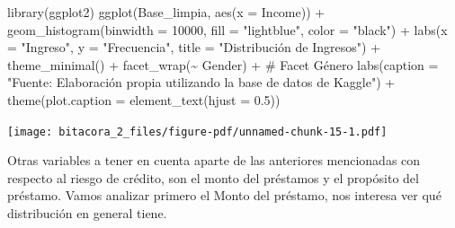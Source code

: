 \documentclass[
  letterpaper,
  DIV=11,
  numbers=noendperiod]{scrreprt}
\newenvironment{Shaded}{\begin{snugshade}}{\end{snugshade}}
\newcommand{\AttributeTok}[1]{\textcolor[rgb]{0.40,0.45,0.13}{#1}}
\newcommand{\CommentTok}[1]{\textcolor[rgb]{0.37,0.37,0.37}{#1}}
\newcommand{\DecValTok}[1]{\textcolor[rgb]{0.68,0.00,0.00}{#1}}
\newcommand{\FloatTok}[1]{\textcolor[rgb]{0.68,0.00,0.00}{#1}}
\newcommand{\FunctionTok}[1]{\textcolor[rgb]{0.28,0.35,0.67}{#1}}
\newcommand{\NormalTok}[1]{\textcolor[rgb]{0.00,0.23,0.31}{#1}}
\newcommand{\SpecialCharTok}[1]{\textcolor[rgb]{0.37,0.37,0.37}{#1}}
\newcommand{\StringTok}[1]{\textcolor[rgb]{0.13,0.47,0.30}{#1}}
\begin{document}
\begin{Shaded}
\begin{Highlighting}[]
\FunctionTok{library}\NormalTok{(ggplot2)}
\FunctionTok{ggplot}\NormalTok{(Base\_limpia, }\FunctionTok{aes}\NormalTok{(}\AttributeTok{x =}\NormalTok{ Income)) }\SpecialCharTok{+} 
  \FunctionTok{geom\_histogram}\NormalTok{(}\AttributeTok{binwidth =} \DecValTok{10000}\NormalTok{, }\AttributeTok{fill =} \StringTok{"lightblue"}\NormalTok{, }\AttributeTok{color =} \StringTok{"black"}\NormalTok{) }\SpecialCharTok{+} 
  \FunctionTok{labs}\NormalTok{(}\AttributeTok{x =} \StringTok{"Ingreso"}\NormalTok{, }\AttributeTok{y =} \StringTok{"Frecuencia"}\NormalTok{, }\AttributeTok{title =} \StringTok{"Distribución de Ingresos"}\NormalTok{) }\SpecialCharTok{+} \FunctionTok{theme\_minimal}\NormalTok{() }\SpecialCharTok{+}
  \FunctionTok{facet\_wrap}\NormalTok{(}\SpecialCharTok{\textasciitilde{}}\NormalTok{ Gender) }\SpecialCharTok{+} \CommentTok{\# Facet Género}
  \FunctionTok{labs}\NormalTok{(}\AttributeTok{caption =} \StringTok{"Fuente: Elaboración propia utilizando la base de datos de Kaggle"}\NormalTok{) }\SpecialCharTok{+}
\FunctionTok{theme}\NormalTok{(}\AttributeTok{plot.caption =} \FunctionTok{element\_text}\NormalTok{(}\AttributeTok{hjust =} \FloatTok{0.5}\NormalTok{)) }
\end{Highlighting}
\end{Shaded}

\texttt{[image: bitacora\_2\_files/figure-pdf/unnamed-chunk-15-1.pdf]}

Otras variables a tener en cuenta aparte de las anteriores mencionadas
con respecto al riesgo de crédito, son el monto del préstamos y el
propósito del préstamo. Vamos analizar primero el Monto del préstamo,
nos interesa ver qué distribución en general tiene.
\end{document}
